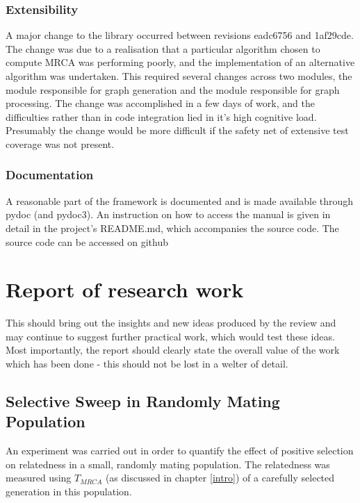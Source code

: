 \documentclass{l4proj}
\begin{document}
\subsection{Extensibility}

A major change to the library occurred between revisions eadc6756 and 1af29cde. The change was due to a realisation that a particular algorithm chosen to compute MRCA was performing poorly, and the implementation of an alternative algorithm was undertaken. This required several changes across two modules, the module responsible for graph generation and the module responsible for graph processing. The change was accomplished in a few days of work, and the difficulties rather than in code integration lied in it's high cognitive load. Presumably the change would be more difficult if the safety net of extensive test coverage was not present.  

\subsection{Documentation}
A reasonable part of the framework is documented and is made available through pydoc (and pydoc3). An instruction on how to access the manual is given in detail in the project's README.md, which accompanies the source code. The source code can be accessed on github \parencite{Kurkiewicz16}



\chapter{Report of research work}\label{research}
This should bring out the insights and new ideas produced by the review and may continue to suggest further practical work, which would test these ideas. Most importantly, the report should clearly state the overall value of the work which has been done - this should not be lost in a welter of detail.

\section{Selective Sweep in Randomly Mating Population}

An experiment was carried out in order to quantify the effect of positive selection on relatedness in a small, randomly mating population. The relatedness was measured using $T_{MRCA}$ (as discussed in chapter \ref{intro}) of a carefully selected generation in this population.
\end{document}
